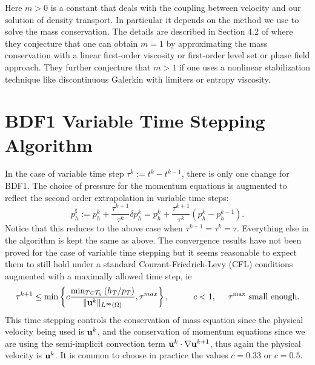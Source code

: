 \documentclass[letterpaper]{erdc}
\begin{document}
\begin{remark}
  Here $m>0$ is a constant that deals with the coupling between velocity and our solution of density transport.  In particular it depends on the method we use to solve the mass conservation.  The details are described in Section 4.2 of \cite{guermond2011error} where they conjecture that one can obtain $m=1$ by approximating the mass conservation with a linear first-order viscosity or first-order level set or phase field approach.  They further conjecture that $m>1$ if one uses a nonlinear stabilization technique like discontinuous Galerkin with limiters or entropy viscosity.  
\end{remark}


%
%
\section{BDF1 Variable Time Stepping Algorithm}\label{sec:BDF1VariableTimeSteppingAlgorithm}
In the case of variable time step  $\tau^{k} := t^{k}-t^{k-1}$, there is only one change for BDF1.  The choice of pressure for the momentum equations is augmented to reflect the second order extrapolation in variable time steps:
\begin{equation}
  p^{\sharp}_h := p_h^{k} + \frac{\tau^{k+1}}{\tau^{k}}\delta p_h^{k} = p_h^{k} + \frac{\tau^{k+1}}{\tau^{k}}\left( p_h^{k} - p_h^{k-1} \right).
\end{equation}
Notice that this reduces to the above case when $\tau^{k+1}=\tau^{k} = \tau$.  Everything else in the algorithm is kept the same as above.  The convergence results have not been proved for the case of variable time stepping but it seems reasonable to expect them to still hold under a standard Courant-Friedrich-Levy (CFL) conditions augmented with a maximally allowed time step, ie
\begin{equation}
  \tau^{k+1} \leq \min \left\{c \frac{\min_{T\in\mathcal{T}_h}\left(h_{T}/p_T\right)}{\|\textbf{u}^{k}\|_{L^{\infty}(\Omega)}}, \tau^{max}\right\}, \hspace{1cm} c<1, \hspace{0.5cm}\tau^{\max} \mbox{ small enough}.
\end{equation}
This time stepping controls the conservation of mass equation since the physical velocity being used is $\textbf{u}^{k}$, and the conservation of momentum equations since we are using the semi-implicit convection term $\textbf{u}^{k}\cdot\nabla\textbf{u}^{k+1}$, thus again the physical velocity is $\textbf{u}^{k}$.  It is common to choose in practice the values $c=0.33$ or $c=0.5$.
\end{document}
